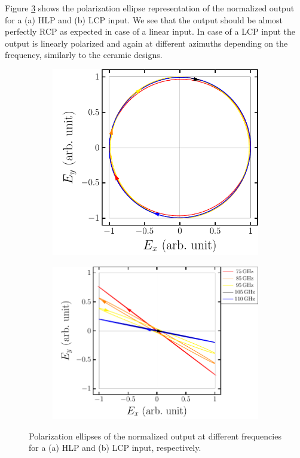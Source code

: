 Figure \ref{fig:polymer_pe_lp} shows the polarization ellipse representation of the normalized output for a (a) HLP and (b) LCP input. We see that the output should be almost perfectly RCP as expected in case of a linear input. In case of a LCP input the output is linearly polarized and again at different azimuths depending on the frequency, similarly to the ceramic designs. 

\begin{figure}[H]
    \begin{subfigure}[b]{.5\linewidth}
    \caption{}\label{}
    \centering\includegraphics[scale=0.7]{images/results/plots/polymer/pe_lp_a.pdf}
    \end{subfigure}%
    \begin{subfigure}[b]{.5\linewidth}
    \caption{}\label{}
    \centering\includegraphics[scale=0.7]{images/results/plots/polymer/pe_lp_b.pdf}
    \end{subfigure}
    \caption{Polarization ellipses of the normalized output at different frequencies for a (a) HLP and (b) LCP input, respectively.}
    \label{fig:polymer_pe_lp}
\end{figure}

